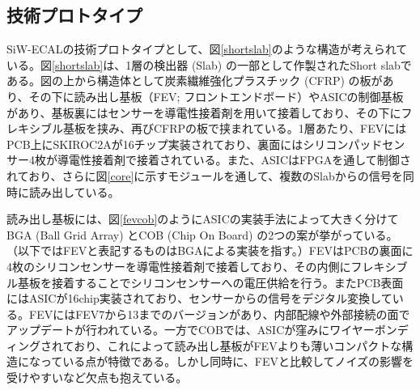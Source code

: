 \subsection{技術プロトタイプ}
SiW-ECALの技術プロトタイプとして、図\ref{shortslab}のような構造が考えられている。図\ref{shortslab}は、1層の検出器 (Slab) の一部として作製されたShort slabである。図の上から構造体として炭素繊維強化プラスチック (CFRP) の板があり、その下に読み出し基板（FEV; フロントエンドボード）やASICの制御基板があり、基板裏にはセンサーを導電性接着剤を用いて接着しており、その下にフレキシブル基板を挟み、再びCFRPの板で挟まれている。1層あたり、FEVにはPCB上にSKIROC2Aが16チップ実装されており、裏面にはシリコンパッドセンサー4枚が導電性接着剤で接着されている。また、ASICはFPGAを通して制御されており、さらに図\ref{core}に示すモジュールを通して、複数のSlabからの信号を同時に読み出している。

読み出し基板には、図\ref{fevcob}のようにASICの実装手法によって大きく分けてBGA (Ball Grid Array) とCOB (Chip On Board) の2つの案が挙がっている。（以下ではFEVと表記するものはBGAによる実装を指す。）FEVはPCBの裏面に4枚のシリコンセンサーを導電性接着剤で接着しており、その内側にフレキシブル基板を接着することでシリコンセンサーへの電圧供給を行う。またPCB表面にはASICが16chip実装されており、センサーからの信号をデジタル変換している。FEVにはFEV7から13までのバージョンがあり、内部配線や外部接続の面でアップデートが行われている。一方でCOBでは、ASICが窪みにワイヤーボンディングされており、これによって読み出し基板がFEVよりも薄いコンパクトな構造になっている点が特徴である。しかし同時に、FEVと比較してノイズの影響を受けやすいなど欠点も抱えている。

